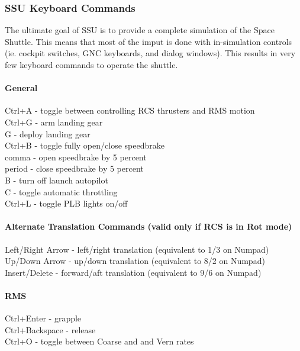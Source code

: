\documentclass[13pt]{article}
\begin{document}
\subsubsection{\large SSU Keyboard Commands}
The ultimate goal of SSU is to provide a complete simulation of the Space Shuttle.  This means that most of the imput is done with in-simulation controls (ie. cockpit switches, GNC keyboards, and dialog windows). This results in very few keyboard commands to operate the shuttle.

\paragraph{General}
Ctrl+A - toggle between controlling RCS thrusters and RMS motion\\
Ctrl+G - arm landing gear\\
G - deploy landing gear\\
Ctrl+B - toggle fully open/close speedbrake\\
comma - open speedbrake by 5 percent\\
period - close speedbrake by 5 percent\\
B - turn off launch autopilot\\
C - toggle automatic throttling\\
Ctrl+L - toggle PLB lights on/off

\paragraph{Alternate Translation Commands (valid only if RCS is in Rot mode)}
Left/Right Arrow - left/right translation (equivalent to 1/3 on Numpad)\\
Up/Down Arrow - up/down translation (equivalent to 8/2 on Numpad)\\
Insert/Delete - forward/aft translation (equivalent to 9/6 on Numpad)\\

\paragraph{RMS}
Ctrl+Enter - grapple\\
Ctrl+Backspace - release\\
Ctrl+O - toggle between Coarse and and Vern rates\\
\end{document}

